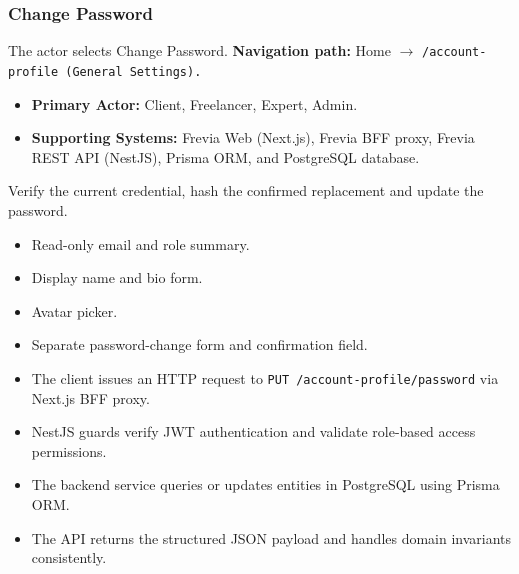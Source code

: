 \subsubsection{Change Password}

The actor selects Change Password.\newline
\textbf{Navigation path:} Home $\rightarrow$ \texttt{/\allowbreak{}account-\allowbreak{}profile (General Settings).}


\begin{itemize}[leftmargin=1.6em,topsep=3pt,itemsep=2pt,parsep=0pt,label=$\bullet$]
    \item \textbf{Primary Actor:} Client, Freelancer, Expert, Admin.
    \item \textbf{Supporting Systems:} Frevia Web (Next.js), Frevia BFF proxy, Frevia REST API (NestJS), Prisma ORM, and PostgreSQL database.
\end{itemize}

\noindent Verify the current credential, hash the confirmed replacement and update the password.

\begin{itemize}[leftmargin=1.6em,topsep=3pt,itemsep=2pt,parsep=0pt,label=$\bullet$]
    \item Read-only email and role summary.
    \item Display name and bio form.
    \item Avatar picker.
    \item Separate password-change form and confirmation field.
\end{itemize}

\begin{itemize}[leftmargin=1.6em,topsep=3pt,itemsep=2pt,parsep=0pt,label=$\bullet$]
    \item The client issues an HTTP request to \texttt{PUT /\allowbreak{}account-\allowbreak{}profile/\allowbreak{}password} via Next.js BFF proxy.
    \item NestJS guards verify JWT authentication and validate role-based access permissions.
    \item The backend service queries or updates entities in PostgreSQL using Prisma ORM.
    \item The API returns the structured JSON payload and handles domain invariants consistently.
\end{itemize}

